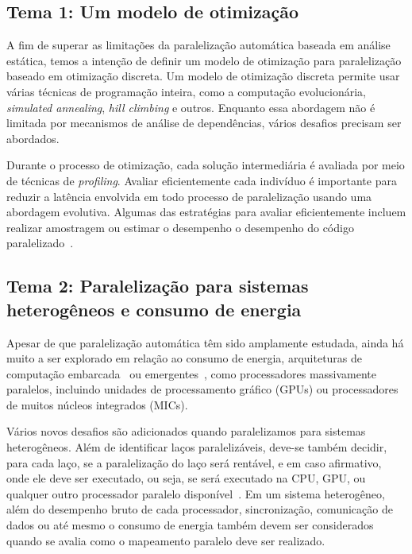 \documentclass[a4paper,12pt]{article}
\newcommand\FIXME[1]{\textcolor{red}{FIX:}\textcolor{red}{#1}}
\begin{document}

\subsection{Tema 1: Um modelo de otimização}

A fim de superar as limitações da paralelização automática baseada em análise estática, temos a intenção de definir um modelo de otimização para paralelização baseado em otimização discreta. Um modelo de otimização discreta permite usar várias técnicas de programação inteira, como a computação evolucionária, \textit{simulated annealing}, \textit{hill climbing} e outros. Enquanto essa abordagem não é limitada por mecanismos de análise de dependências, vários desafios precisam ser abordados.

Durante o processo de otimização, cada solução intermediária é avaliada por meio de técnicas de \textit{profiling}. Avaliar eficientemente cada indivíduo é importante para reduzir a latência envolvida em todo processo de paralelização usando uma abordagem evolutiva. Algumas das estratégias para avaliar eficientemente incluem realizar amostragem ou estimar o desempenho o desempenho do código paralelizado~\cite{douskos11,misailovic11,zhu12,fahringer95b,fahringer00,fahringer11}.

\subsection{Tema 2: Paralelização para sistemas heterogêneos e consumo de energia}

Apesar de que paralelização automática têm sido amplamente estudada, ainda há muito a ser explorado em relação ao consumo de energia, arquiteturas de computação embarcada~\cite{cordes10} ou emergentes~\cite{leung09,baskaran10,amini12,govindarajan13}, como processadores massivamente paralelos, incluindo unidades de processamento gráfico (GPUs) ou processadores de muitos núcleos integrados (MICs).

Vários novos desafios são adicionados quando paralelizamos para sistemas heterogêneos. Além de identificar laços paralelizáveis, deve-se também decidir, para cada laço, se a paralelização do laço será rentável, e em caso afirmativo, onde ele deve ser executado, ou seja, se será executado na CPU, GPU, ou qualquer outro processador paralelo disponível~\cite{tournavitis09,wang14a,leung09}. Em um sistema heterogêneo, além do desempenho bruto de cada processador, sincronização, comunicação de dados ou até mesmo o consumo de energia também devem ser considerados quando se avalia como o mapeamento paralelo deve ser realizado.
\end{document}
